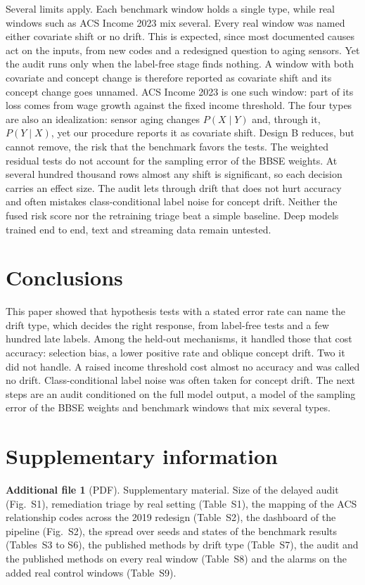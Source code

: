 \documentclass[pdflatex,referee,lineno,sn-basic]{sn-jnl}
\begin{document}
Several limits apply. Each benchmark window holds a single type, while real windows such as ACS Income 2023 mix several. Every real window was named either covariate shift or no drift. This is expected, since most documented causes act on the inputs, from new codes and a redesigned question to aging sensors. Yet the audit runs only when the label-free stage finds nothing. A window with both covariate and concept change is therefore reported as covariate shift and its concept change goes unnamed. ACS Income 2023 is one such window: part of its loss comes from wage growth against the fixed income threshold. The four types are also an idealization: sensor aging changes $P(X\mid Y)$ and, through it, $P(Y\mid X)$, yet our procedure reports it as covariate shift. Design B reduces, but cannot remove, the risk that the benchmark favors the tests. The weighted residual tests do not account for the sampling error of the BBSE weights. At several hundred thousand rows almost any shift is significant, so each decision carries an effect size. The audit lets through drift that does not hurt accuracy and often mistakes class-conditional label noise for concept drift. Neither the fused risk score nor the retraining triage beat a simple baseline. Deep models trained end to end, text and streaming data remain untested.

\section{Conclusions}\label{sec:conclusions}

This paper showed that hypothesis tests with a stated error rate can name the drift type, which decides the right response, from label-free tests and a few hundred late labels. Among the held-out mechanisms, it handled those that cost accuracy: selection bias, a lower positive rate and oblique concept drift. Two it did not handle. A raised income threshold cost almost no accuracy and was called no drift. Class-conditional label noise was often taken for concept drift. The next steps are an audit conditioned on the full model output, a model of the sampling error of the BBSE weights and benchmark windows that mix several types.

\section*{Supplementary information}

\textbf{Additional file 1} (PDF). Supplementary material. Size of the delayed audit (Fig.~S1), remediation triage by real setting (Table~S1), the mapping of the ACS relationship codes across the 2019 redesign (Table~S2), the dashboard of the pipeline (Fig.~S2), the spread over seeds and states of the benchmark results (Tables~S3 to S6), the published methods by drift type (Table~S7), the audit and the published methods on every real window (Table~S8) and the alarms on the added real control windows (Table~S9).
\end{document}
